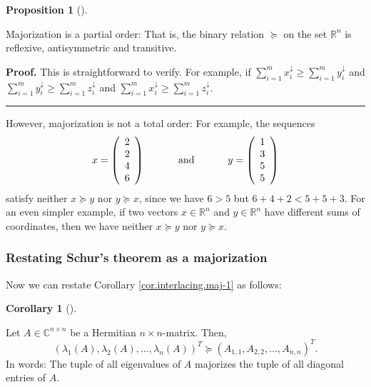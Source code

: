 \documentclass[numbers=enddot,12pt,final,onecolumn,notitlepage]{scrartcl}%
\numberwithin{exer}{subsection}
\theoremstyle{definition}
\newtheorem{prop}[theo]{Proposition}
\newenvironment{proposition}[1][]
{\begin{prop}[#1]\begin{leftbar}}
{\end{leftbar}\end{prop}}
\newtheorem{coro}[theo]{Corollary}
\newenvironment{corollary}[1][]
{\begin{coro}[#1]\begin{leftbar}}
{\end{leftbar}\end{coro}}
\newenvironment{proof}[1][Proof]{\noindent\textbf{#1.} }{\ \rule{0.5em}{0.5em}}
\let\sumnonlimits\sum
\renewcommand{\sum}{\sumnonlimits\limits}
\begin{document}
\begin{proposition}
Majorization is a partial order: That is, the binary relation $\succcurlyeq$
on the set $\mathbb{R}^{n}$ is reflexive, antisymmetric and transitive.
\end{proposition}

\begin{proof}
This is straightforward to verify. For example, if $\sum_{i=1}^{m}%
x_{i}^{\downarrow}\geq\sum_{i=1}^{m}y_{i}^{\downarrow}$ and $\sum_{i=1}%
^{m}y_{i}^{\downarrow}\geq\sum_{i=1}^{m}z_{i}^{\downarrow}$ and $\sum
_{i=1}^{m}x_{i}^{\downarrow}\geq\sum_{i=1}^{m}z_{i}^{\downarrow}$.
\end{proof}

However, majorization is not a total order: For example, the sequences%
\[
x=\left(
\begin{array}
[c]{c}%
2\\
2\\
4\\
6
\end{array}
\right)  \ \ \ \ \ \ \ \ \ \ \text{and}\ \ \ \ \ \ \ \ \ \ y=\left(
\begin{array}
[c]{c}%
1\\
3\\
5\\
5
\end{array}
\right)
\]
satisfy neither $x\succcurlyeq y$ nor $y\succcurlyeq x$, since we have $6>5$
but $6+4+2<5+5+3$. For an even simpler example, if two vectors $x\in
\mathbb{R}^{n}$ and $y\in\mathbb{R}^{n}$ have different sums of coordinates,
then we have neither $x\succcurlyeq y$ nor $y\succcurlyeq x$.

\subsubsection{Restating Schur's theorem as a majorization}

Now we can restate Corollary \ref{cor.interlacing.maj-1} as follows:

\begin{corollary}
[Schur's theorem]\label{cor.interlacing.maj-2}Let $A\in\mathbb{C}^{n\times n}$
be a Hermitian $n\times n$-matrix. Then,%
\[
\left(  \lambda_{1}\left(  A\right)  ,\lambda_{2}\left(  A\right)
,\ldots,\lambda_{n}\left(  A\right)  \right)  ^{T}\succcurlyeq\left(
A_{1,1},A_{2,2},\ldots,A_{n,n}\right)  ^{T}.
\]
In words: The tuple of all eigenvalues of $A$ majorizes the tuple of all
diagonal entries of $A$.
\end{corollary}
\end{document}
